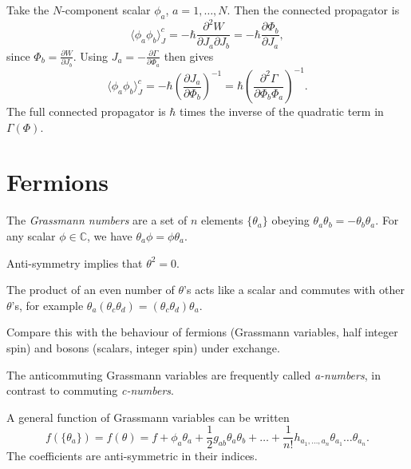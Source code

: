 
\begin{example}[]
  Take the $N$-component scalar $\phi_a$, $a = 1, \dots, N$.
  Then the connected propagator is
  \begin{equation}
    \langle \phi_a \phi_b \rangle^{c}_{J} = -\hbar \frac{\partial^2 W}{\partial J_a \partial J_b} = -\hbar \frac{\partial \Phi_b}{\partial J_a},
  \end{equation}
  since $\Phi_b = \frac{\partial W}{\partial J_b}$. Using $J_a = -\frac{\partial \Gamma}{\partial \Phi_a}$ then gives
  \begin{equation}
    \langle \phi_a \phi_b \rangle^c_J = -\hbar \left( \frac{\partial J_a}{\partial \Phi_b} \right)^{-1} = \hbar \left( \frac{\partial^2 \Gamma}{\partial \Phi_b \Phi_a} \right)^{-1}.
  \end{equation}
  The full connected propagator is $\hbar$ times the inverse of the quadratic term in $\Gamma(\Phi)$.
\end{example}

\section{Fermions}%
\label{sec:fermions}

\begin{definition}
  The \emph{Grassmann numbers} are a set of $n$ elements $\{\theta_a\}$ obeying $\theta_a \theta_b = -\theta_b \theta_a$.
  For any scalar $\phi \in \mathbb{C}$, we have $\theta_a \phi = \phi \theta_a$.
\end{definition}
\begin{remark}
  Anti-symmetry implies that $\theta^2 = 0$.
\end{remark}
\begin{remark}
  The product of an even number of $\theta$'s acts like a scalar and commutes with other $\theta$'s, for example $\theta_a (\theta_c \theta_d) = (\theta_c \theta_d) \theta_a$.
  \begin{leftbar}
    Compare this with the behaviour of fermions (Grassmann variables, half integer spin) and bosons (scalars, integer spin) under exchange.
  \end{leftbar}
\end{remark}
\begin{leftbar}
  The anticommuting Grassmann variables are frequently called \emph{a-numbers}, in contrast to commuting \emph{c-numbers}.
\end{leftbar}
A general function of Grassmann variables can be written
\begin{equation}
  f(\{\theta_a\}) = f(\theta) = f + \phi_a \theta_a + \frac{1}{2} g_{ab} \theta_a \theta_b + \dots + \frac{1}{n!} h_{a_1, \dots, a_n} \theta_{a_1} \dots \theta_{a_n}.
\end{equation}
The coefficients are anti-symmetric in their indices.

